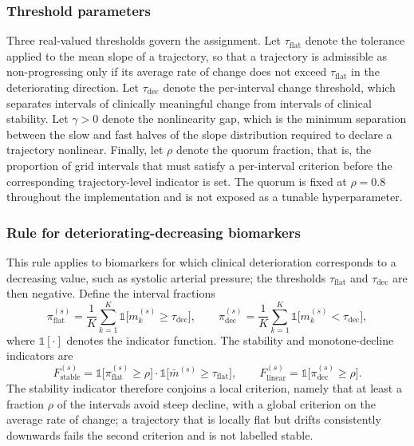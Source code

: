 \subsubsection{Threshold parameters}

Three real-valued thresholds govern the assignment. Let $\tau_{\mathrm{flat}}$ denote the tolerance applied to the mean slope of a trajectory, so that a trajectory is admissible as non-progressing only if its average rate of change does not exceed $\tau_{\mathrm{flat}}$ in the deteriorating direction. Let $\tau_{\mathrm{dec}}$ denote the per-interval change threshold, which separates intervals of clinically meaningful change from intervals of clinical stability. Let $\gamma>0$ denote the nonlinearity gap, which is the minimum separation between the slow and fast halves of the slope distribution required to declare a trajectory nonlinear. Finally, let $\rho$ denote the quorum fraction, that is, the proportion of grid intervals that must satisfy a per-interval criterion before the corresponding trajectory-level indicator is set. The quorum is fixed at $\rho=0.8$ throughout the implementation and is not exposed as a tunable hyperparameter.

\subsubsection{Rule for deteriorating-decreasing biomarkers}

This rule applies to biomarkers for which clinical deterioration corresponds to a decreasing value, such as systolic arterial pressure; the thresholds $\tau_{\mathrm{flat}}$ and $\tau_{\mathrm{dec}}$ are then negative. Define the interval fractions
$$\pi^{(s)}_{\mathrm{flat}}=\frac{1}{K}\sum_{k=1}^{K}\mathbb{1}\bigl[m^{(s)}_k\ge\tau_{\mathrm{dec}}\bigr],\qquad\pi^{(s)}_{\mathrm{dec}}=\frac{1}{K}\sum_{k=1}^{K}\mathbb{1}\bigl[m^{(s)}_k<\tau_{\mathrm{dec}}\bigr],$$
where $\mathbb{1}[\cdot]$ denotes the indicator function. The stability and monotone-decline indicators are
$$F^{(s)}_{\mathrm{stable}}=\mathbb{1}\bigl[\pi^{(s)}_{\mathrm{flat}}\ge\rho\bigr]\cdot\mathbb{1}\bigl[\bar{m}^{(s)}\ge\tau_{\mathrm{flat}}\bigr],\qquad F^{(s)}_{\mathrm{linear}}=\mathbb{1}\bigl[\pi^{(s)}_{\mathrm{dec}}\ge\rho\bigr].$$
The stability indicator therefore conjoins a local criterion, namely that at least a fraction $\rho$ of the intervals avoid steep decline, with a global criterion on the average rate of change; a trajectory that is locally flat but drifts consistently downwards fails the second criterion and is not labelled stable.

